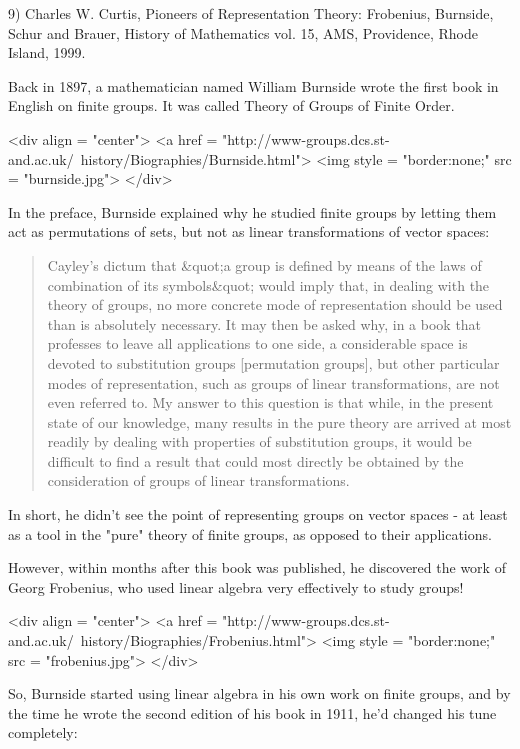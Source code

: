 9) Charles W. Curtis, Pioneers of Representation Theory: Frobenius,
Burnside, Schur and Brauer, History of Mathematics vol. 15, AMS,
Providence, Rhode Island, 1999.

Back in 1897, a mathematician named William Burnside wrote the first
book in English on finite groups.  It was called Theory of Groups of 
Finite Order.  

<div align = "center">
<a href = "http://www-groups.dcs.st-and.ac.uk/~history/Biographies/Burnside.html">
<img style = "border:none;" src = "burnside.jpg">
</div>

In the preface, Burnside explained why he studied finite 
groups by letting them act as permutations of sets, but not as 
linear transformations of vector spaces:

\begin{quote}
   Cayley's dictum that &quot;a group is defined by means of the laws of
   combination of its symbols&quot; would imply that, in dealing with the
   theory of groups, no more concrete mode of representation should be
   used than is absolutely necessary.  It may then be asked why, in 
   a book that professes to leave all applications to one side, a 
   considerable space is devoted to substitution groups [permutation
   groups], but other particular modes of representation, such as 
   groups of linear transformations, are not even referred to.  My
   answer to this question is that while, in the present state of our
   knowledge, many results in the pure theory are arrived at most 
   readily by dealing with properties of substitution groups, it 
   would be difficult to find a result that could most directly be 
   obtained by the consideration of groups of linear transformations.
\end{quote}
    

In short, he didn't see the point of representing groups on vector 
spaces - at least as a tool in the "pure" theory of finite
groups, as opposed to their applications.

However, within months after this book was published, he discovered
the work of Georg Frobenius, who used linear algebra very effectively to
study groups! 

<div align = "center">
<a href = "http://www-groups.dcs.st-and.ac.uk/~history/Biographies/Frobenius.html">
<img style = "border:none;" src = "frobenius.jpg">
</div>

So, Burnside started using linear algebra in his own work on 
finite groups, and by the time he wrote the second edition of his 
book in 1911, he'd changed his tune completely:

